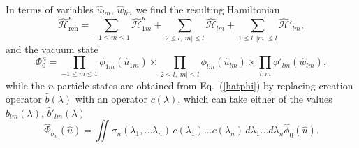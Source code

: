 \documentclass[12pt]{article}
\newcommand{\HH}{\mathscr{H}}
\begin{document}
	In terms of variables
$ \hat{u}_{lm} $,
$ \hat{w}_{lm} $
	we find the resulting Hamiltonian
\begin{equation*}
    \hat{\HH}_{\text{ren}}^{\kappa}
	= \sum_{-1\leq m\leq 1} \hat{\HH}_{1m}^{\kappa}
	+ \sum_{2\leq l, |m|\leq l} \hat{\HH}_{lm}
	+ \sum_{1\leq l, |m|\leq l} \hat{\HH}'_{lm} ,
\end{equation*}
	and the vacuum state
\begin{equation*}
    \Phi_{0}^{\kappa} = \prod_{-1\leq m \leq 1} \phi_{1m}(\hat{u}_{1m}) \times
    \prod_{2\leq l, |m|\leq l} \phi_{lm}(\hat{u}_{lm}) \times
	\prod_{l,m} \phi'_{lm}(\hat{w}_{lm}) ,
\end{equation*}
	while the
$ n $-particle states are obtained from
Eq.~(\ref{hatphi})
	by replacing creation operator
$ \hat{b}(\lambda) $ with an operator
$ c(\lambda) $,
	which can take either of the values
$ \hat{b}_{lm}(\lambda) $, $ \hat{b}'_{lm}(\lambda) $
\begin{equation*}
    \hat{\Phi}_{\sigma_{n}}(\hat{u}) = \iint
    \sigma_{n} (\lambda_{1},\ldots \lambda_{n}) \,
	c(\lambda_{1}) \ldots c(\lambda_{n}) \,
    d\lambda_{1} \ldots d\lambda_{n} \hat{\phi}_{0}(\hat{u}) .
\end{equation*}




\end{document}
